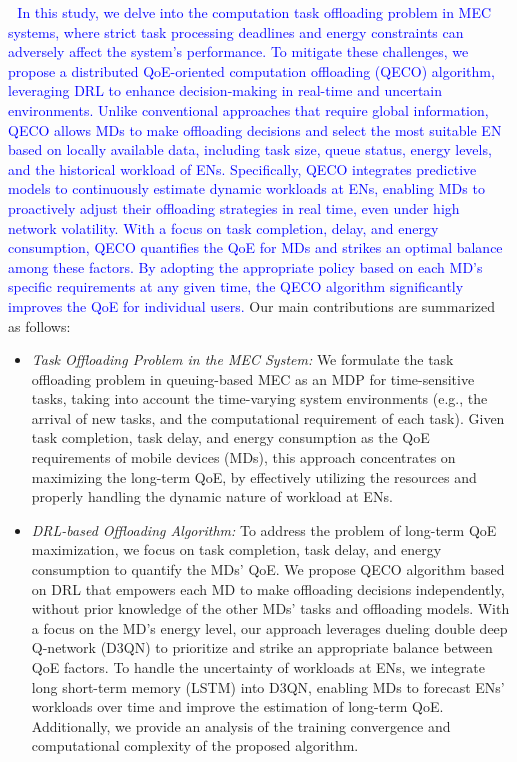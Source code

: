 \documentclass[12pt,draftclsnofoot,onecolumn]{IEEEtran}
\newenvironment{my}[2]%
{\begin{list}{}%
{\setlength{\rightmargin}{#1}\setlength{\leftmargin}{#2}}%


 \item[]{}

} {\end{list}}
\begin{document}
\begin{enumerate}
\begin{my}{1cm}{1cm}
{		
		\textcolor{blue}{\,\,\,\,In this study, we delve into the computation task offloading problem in MEC systems, where strict task processing deadlines and energy constraints can adversely affect the system's performance. To mitigate these challenges, we propose a distributed QoE-oriented computation offloading (QECO) algorithm, leveraging DRL to enhance decision-making in real-time and uncertain environments. Unlike conventional approaches that require global information, QECO allows MDs to make offloading decisions and select the most suitable EN based on locally available data, including task size, queue status, energy levels, and the historical workload of ENs. Specifically, QECO integrates predictive models to continuously estimate dynamic workloads at ENs, enabling MDs to proactively adjust their offloading strategies in real time, even under high network volatility. With a focus on task completion, delay, and energy consumption, QECO quantifies the QoE for MDs and strikes an optimal balance among these factors. By adopting the appropriate policy based on each MD’s specific requirements at any given time, the QECO algorithm significantly improves the QoE for individual users.} \vspace{2mm}
		Our main contributions are summarized as follows:
		\begin{itemize}
			\item \textit{Task Offloading Problem in the MEC System:} We formulate the task offloading problem in queuing-based MEC as an MDP for time-sensitive tasks, taking into account the time-varying system environments (e.g., the arrival of new tasks, and the computational requirement of each task). Given task completion, task delay, and energy consumption as the QoE requirements of mobile devices (MDs), this approach concentrates on maximizing the long-term QoE, by effectively utilizing the resources and properly handling the dynamic nature of workload at ENs. \vspace{2mm}
			
			
			\item \textit{DRL-based Offloading Algorithm:} To address the problem of long-term QoE maximization, we focus on task completion, task delay, and energy consumption to quantify the MDs' QoE. We propose QECO algorithm based on DRL that empowers each MD to make offloading decisions independently, without prior knowledge of the other MDs' tasks and offloading models. With a focus on the MD's energy level, our approach leverages dueling double deep Q-network (D3QN) \cite{wang2016dueling} to prioritize and strike an appropriate balance between QoE factors. To handle the uncertainty of workloads at ENs, we integrate long short-term memory (LSTM) \cite{hochreiter1997long} into D3QN, enabling MDs to forecast ENs' workloads over time and improve the estimation of long-term QoE. Additionally, we provide an analysis of the training convergence and computational complexity of the proposed algorithm. \vspace{2mm}
			

\end{itemize}}
\end{my}
\end{enumerate}
\end{document}
